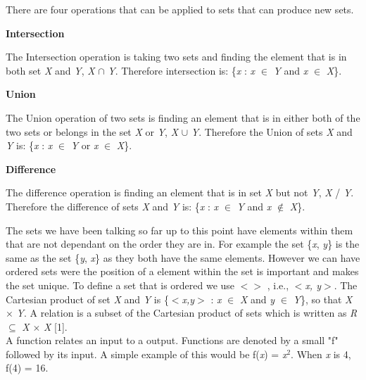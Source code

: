 \documentclass[11pt,a4paper]{report}
\begin{document}
\noindent There are four operations that can be applied to sets that can produce new sets.  

\textbf{Intersection} 

\indent The Intersection operation is taking two sets and finding the element that is in both set \textit{X} and \textit{Y}, \textit{X} $\cap$ \textit{Y}. Therefore intersection is: \{\textit{x} : \textit{x} $\in$ \textit{Y} and \textit{x} $\in$ \textit{X}\}. 

\textbf{Union}

\indent The Union operation of two sets is finding an element that is in either both of the two sets or belongs in the set \textit{X} or \textit{Y}, \textit{X} $\cup$ \textit{Y}. Therefore the Union of sets \textit{X} and \textit{Y} is: \{\textit{x} : \textit{x} $\in$ \textit{Y} or \textit{x} $\in$ \textit{X}\}. 

\textbf{Difference}

\indent The difference operation is finding an element that is in set \textit{X} but not \textit{Y}, \textit{X} / \textit{Y}. Therefore the difference of sets \textit{X} and \textit{Y} is: \{\textit{x} : \textit{x} $\in$ \textit{Y} and \textit{x} $\not \in$ \textit{X}\}.

The sets we have been talking so far up to this point have elements within them that are not dependant on the order they are in. For example the set \{\textit{x}, \textit{y}\} is the same as the set \{\textit{y}, \textit{x}\} as they both have the same elements. However we can have ordered sets were the position of a element within the set is important and makes the set unique. To define a set that is ordered we use $<> $ , i.e., $<$\textit{x, y}$>$. 
The Cartesian product of set \textit{X} and \textit{Y} is \{$<$\textit{x,y}$>$ : \textit{x} $\in$ \textit{X} and \textit{y} $\in$ \textit{Y}\}, so that \textit{X} $\times$ \textit{Y}.
A relation is a subset of the Cartesian product of sets which is written as \textit{R} $\subseteq$ \textit{X} $\times$ \textit{X} [1].\\

A function relates an input to a output. Functions are denoted by a small "f" followed by its input. A simple example of this would be f(\textit{x}) = \textit{x}$^2$. When \textit{x} is 4, f(4) = {16}.
\end{document}
